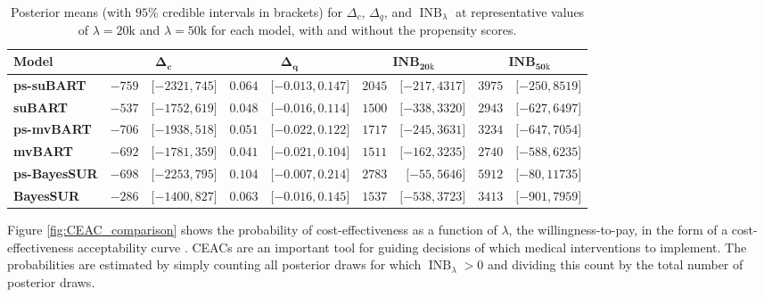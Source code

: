 \documentclass[aoas,preprint]{imsart}
\theoremstyle{plain}
\theoremstyle{definition}
\theoremstyle{remark}
\begin{document}
\begin{table}[H]
\caption{Posterior means (with $95\%$ credible intervals in brackets) for $\Delta_c$, $\Delta_q$, and $\operatorname{INB}_\lambda$ at representative values of $\lambda=20\mathrm{k}$ and $\lambda=50\mathrm{k}$ for each model, with and without the propensity scores.\label{tab:inb_ci}}
\setlength{\tabcolsep}{3.33pt}
\begin{tabular}{lrrrrrrrr}
\textbf{Model} & \multicolumn{2}{c}{$\mathbf{\Delta_c}$}  & \multicolumn{2}{c}{$\mathbf{\Delta_q}$} & \multicolumn{2}{c}{$\mathbf{INB_{20\mathrm{k}}}$}& \multicolumn{2}{c}{$\mathbf{INB_{50\mathrm{k}}}$}\\
\hline
\textbf{ps-suBART}   & $-759$&$\lbrack-2321, 745\rbrack$ & $ 0.064$&  $\lbrack-0.013, 0.147\rbrack$ & $2045$&$\lbrack-217, 4317\rbrack$  &$3975$&$\lbrack-250, 8519\rbrack$  \\
\textbf{suBART}   & $-537$&$\lbrack-1752, 619\rbrack$ & $0.048$&$\lbrack-0.016, 0.114\rbrack$ & $1500$&$\lbrack-338, 3320\rbrack$  &$2943$&$\lbrack-627, 6497\rbrack$  \\
\textbf{ps-mvBART}   & $-706$&$\lbrack-1938, 518\rbrack$ & $0.051$&$\lbrack-0.022, 0.122\rbrack$ & $1717$&$\lbrack-245, 3631\rbrack$ &$3234$&$\lbrack-647, 7054\rbrack$  \\
\textbf{mvBART}   & $-692 $&$\lbrack-1781, 359\rbrack$ & $0.041$&$\lbrack-0.021, 0.104\rbrack$ & $1511$&$\lbrack-162, 3235\rbrack$ &$2740$&$\lbrack-588, 6235\rbrack$  \\
\textbf{ps-BayesSUR} & $-698$&$\lbrack-2253, 795\rbrack$ & $0.104$&$\lbrack-0.007, 0.214\rbrack$  & $2783$&$\lbrack-55, 5646\rbrack$ &$5912$&$\lbrack-80, 11735\rbrack$  \\
\textbf{BayesSUR} & $-286$&$\lbrack-1400, 827\rbrack$ & $0.063$&$\lbrack-0.016, 0.145\rbrack$  & $1537$&$\lbrack-538, 3723\rbrack$ &$3413$&$\lbrack-901, 7959\rbrack$
\end{tabular}
\end{table}\vspace{-1ex}
Figure \ref{fig:CEAC_comparison} shows the probability of cost-effectiveness as a function of $\lambda$, the willingness-to-pay, in the form of a cost-effectiveness acceptability curve \citep[CEAC;][]{lothgren2000definition}. CEACs are an important tool for guiding decisions of which medical interventions to implement. The probabilities are estimated by simply counting all posterior draws for which $\operatorname{INB}_{\lambda} > 0$ and dividing this count by the total number of posterior draws.\vspace{-1ex} 
\end{document}
